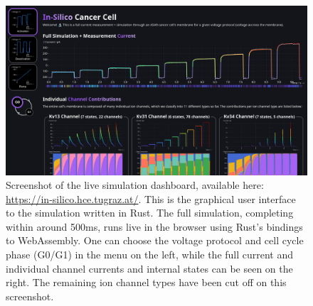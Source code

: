 \begin{figure}[ht]
  \includegraphics[width=\textwidth]{../figures/above-the-fold-screenshot.png}
  \caption{Screenshot of the live simulation dashboard, available here: \url{https://in-silico.hce.tugraz.at/}. This is the graphical user interface to the simulation written in Rust. The full simulation, completing within around 500ms, runs live in the browser using Rust's bindings to WebAssembly. One can choose the voltage protocol and cell cycle phase (G0/G1) in the menu on the left, while the full current and individual channel currents and internal states can be seen on the right. The remaining ion channel types have been cut off on this screenshot.}
  \label{figure:screenshot}
\end{figure}
